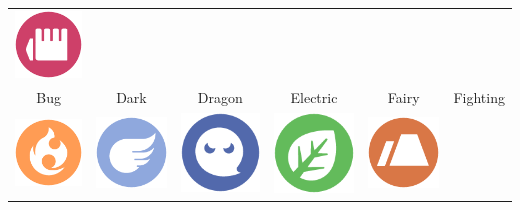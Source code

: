 \begin{table}[h]
\begin{tabular}{c c c c c c}
    \includegraphics[scale=.25]{images/fighting.png} \\
  Bug & Dark & Dragon & Electric & Fairy & Fighting \\
  \includegraphics[scale=.25]{images/fire.png} &
    \includegraphics[scale=.25]{images/flying.png} &
    \includegraphics[scale=.25]{images/ghost.png} &
    \includegraphics[scale=.25]{images/grass.png} &
    \includegraphics[scale=.25]{images/ground.png} &

\end{tabular}
\end{table}
